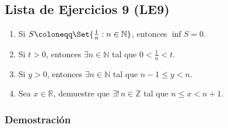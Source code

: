 \documentclass[11pt]{article}
\newcommand{\N}{\mathbb{N}}
\newcommand{\Z}{\mathbb{Z}}
\newcommand{\R}{\mathbb{R}}
\let\set\Set
\begin{document}
\subsection*{Lista de Ejercicios 9 (LE9)}

\begin{enumerate}[label=\alph*)]
    \item Si $S \coloneqq \set{\frac{1}{n}: n\in \N}$, entonces $\inf{S=0}$.
    \item Si $t>0$, entonces $\exists n\in \N$ tal que $0<\frac{1}{n}<t$.
    \item Si $y>0$, entonces $\exists n\in \N$ tal que $n-1\leq y< n$.
    \item Sea $x\in \R$, demuestre que $\exists! \, n\in \Z$ tal que $n\leq x<n+1$.
\end{enumerate}

\subsubsection*{Demostración}
\end{document}
